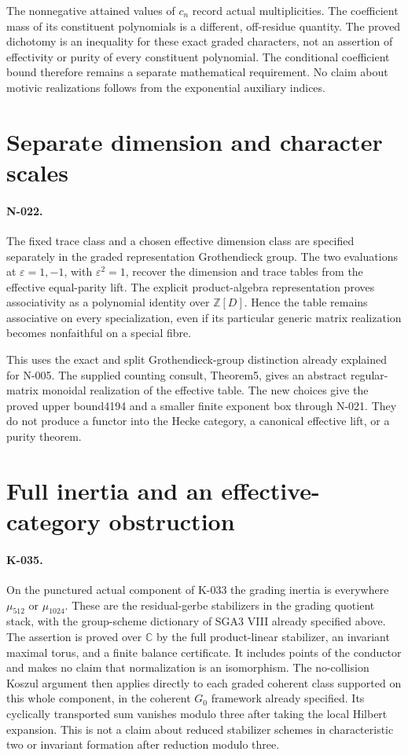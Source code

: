 The nonnegative attained values of $c_n$ record actual multiplicities.
The coefficient mass of its constituent polynomials is a different,
off-residue quantity. The proved dichotomy is an inequality for these
exact graded characters, not an assertion of effectivity or purity
of every constituent polynomial. The conditional coefficient bound
therefore remains a separate mathematical requirement. No claim about
motivic realizations follows from the exponential auxiliary indices.

\section{Separate dimension and character scales}
\paragraph{N-022.}
The fixed trace class and a chosen effective dimension class are
specified separately in the graded representation Grothendieck group.
The two evaluations at $\varepsilon=1,-1$, with $\varepsilon^2=1$,
recover the dimension and trace tables from the effective equal-parity
lift. The explicit product-algebra representation proves associativity
as a polynomial identity over $\mathbb Z[D]$. Hence the table remains
associative on every specialization, even if its particular generic
matrix realization becomes nonfaithful on a special fibre.

This uses the exact and split Grothendieck-group distinction already
explained for N-005. The supplied counting consult, Theorem5, gives an
abstract regular-matrix monoidal realization of the effective table.
The new choices give the proved upper bound4194 and a smaller finite
exponent box through N-021. They do not produce a functor into the
Hecke category, a canonical effective lift, or a purity theorem.

\section{Full inertia and an effective-category obstruction}

\paragraph{K-035.}
On the punctured actual component of K-033 the grading inertia is
everywhere $\mu_{512}$ or $\mu_{1024}$. These are the residual-gerbe
stabilizers in the grading quotient stack, with the group-scheme
dictionary of SGA3 VIII already specified above. The assertion is
proved over $\mathbb C$ by the full product-linear stabilizer, an
invariant maximal torus, and a finite balance certificate. It includes
points of the conductor and makes no claim that normalization is an
isomorphism. The no-collision Koszul argument then applies directly to
each graded coherent class supported on this whole component, in the
coherent $G_0$ framework already specified. Its cyclically transported
sum vanishes modulo three after taking the local Hilbert expansion.
This is not a claim about reduced stabilizer schemes in characteristic
two or invariant formation after reduction modulo three.

